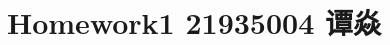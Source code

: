 \documentclass[a4paper]{book}
\makeatletter
\newcommand{\voidenvironment}[1]{%
  \expandafter\providecommand\csname env@#1@save@env\endcsname{}%
  \expandafter\providecommand\csname env@#1@process\endcsname{}%
  \@ifundefined{#1}{}{\RenewEnviron{#1}{}}%
}
\numberwithin{equation}{chapter}
\theoremstyle{definition}
\makeatother
\begin{document}
\pagestyle{empty}
%



\setcounter{chapter}{0}




\chapter{Homework1 21935004 谭焱}
\end{document}
